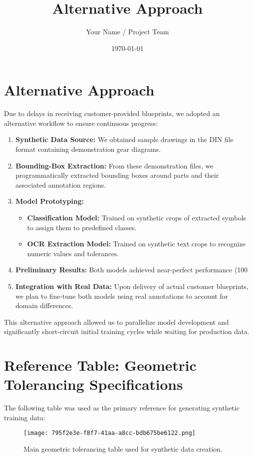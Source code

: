 \documentclass[a4paper,12pt]{article}
\title{Alternative Approach}
\author{Your Name / Project Team}
\date{\today}
\begin{document}
\maketitle

\section*{Alternative Approach}
Due to delays in receiving customer-provided blueprints, we adopted an alternative workflow to ensure continuous progress:

\begin{enumerate}
\item \textbf{Synthetic Data Source:} We obtained sample drawings in the DIN file format containing demonstration gear diagrams.
\item \textbf{Bounding-Box Extraction:} From these demonstration files, we programmatically extracted bounding boxes around parts and their associated annotation regions.
\item \textbf{Model Prototyping:}
\begin{itemize}
\item \textbf{Classification Model:} Trained on synthetic crops of extracted symbols to assign them to predefined classes.
\item \textbf{OCR Extraction Model:} Trained on synthetic text crops to recognize numeric values and tolerances.
\end{itemize}
\item \textbf{Preliminary Results:} Both models achieved near-perfect performance (100%
\item \textbf{Integration with Real Data:} Upon delivery of actual customer blueprints, we plan to fine-tune both models using real annotations to account for domain differences.
\end{enumerate}

This alternative approach allowed us to parallelize model development and significantly short-circuit initial training cycles while waiting for production data.

\section*{Reference Table: Geometric Tolerancing Specifications}
The following table was used as the primary reference for generating synthetic training data:

\begin{figure}[h!]
\centering
\texttt{[image: 795f2e3e-f8f7-41aa-a8cc-bdb675be6122.png]}
\caption{Main geometric tolerancing table used for synthetic data creation.}
\label{fig:geom_tol}
\end{figure}
\end{document}
